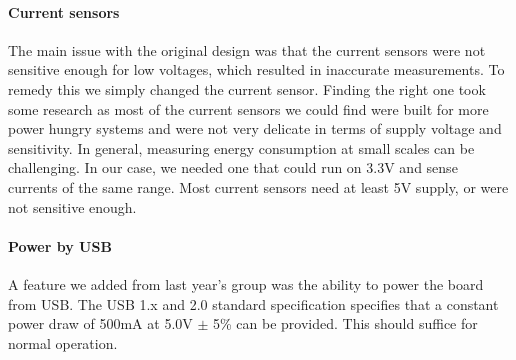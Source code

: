 \paragraph{Current sensors} \label{psu:current_sensors}
The main issue with the original design was that the current sensors were not
sensitive enough for low voltages, which resulted in inaccurate measurements. To
remedy this we simply changed the current sensor. Finding the right one took
some research as most of the current sensors we could find were built for more
power hungry systems and were not very delicate in terms of supply voltage and
sensitivity. In general, measuring energy consumption at small scales  can be challenging. In our case, we needed one that could run on 3.3V and
sense currents of the same range. Most current sensors need at least 5V supply,
or were not sensitive enough.

\paragraph{Power by USB} \label{psu:usb}
A feature we added from last year's group was the ability to power the board
from USB. The USB 1.x and 2.0 standard specification specifies that a constant
power draw of 500mA at 5.0V $\pm$ 5\% can be provided.  This should suffice for normal operation.
